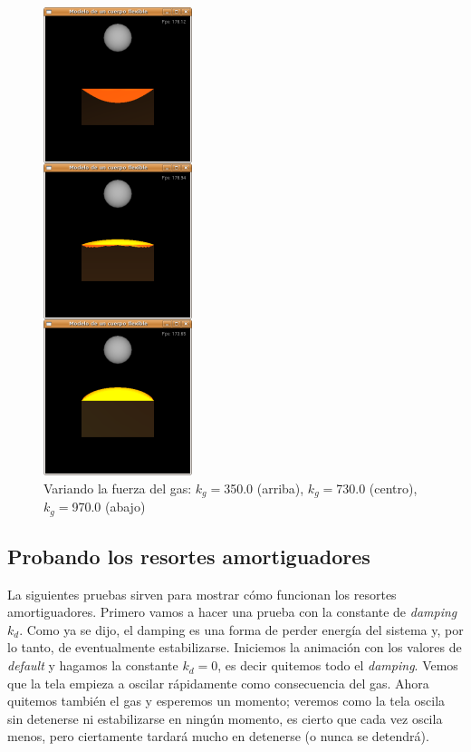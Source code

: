 \begin{figure}
 \centering
 \includegraphics[]{Img/modPres4}
 \caption[Ejecución con diferentes valores de la constante de gas]{Variando la fuerza del gas: $k_g=$350.0 (arriba), $k_g=$730.0 (centro), $k_g=$970.0 (abajo)}
 \label{pres:test4}
\end{figure}

\subsection{Probando los resortes amortiguadores}
La siguientes pruebas sirven para mostrar cómo funcionan los resortes amortiguadores.
Primero vamos a hacer una prueba con la constante de \emph{\foreignlanguage{english}{damping}} $k_d$.
Como ya se dijo, el damping es una forma de perder energía del sistema y, por lo tanto, de eventualmente estabilizarse.
Iniciemos la animación con los valores de \emph{\foreignlanguage{english}{default}} y hagamos la constante $k_d=0$, es decir quitemos todo el \emph{\foreignlanguage{english}{damping}}.
Vemos que la tela empieza a oscilar rápidamente como consecuencia del gas.
Ahora quitemos también el gas y esperemos un momento; veremos como la tela oscila sin detenerse ni estabilizarse en ningún momento, es cierto que cada vez oscila menos, pero ciertamente tardará mucho en detenerse (o nunca se detendrá).

